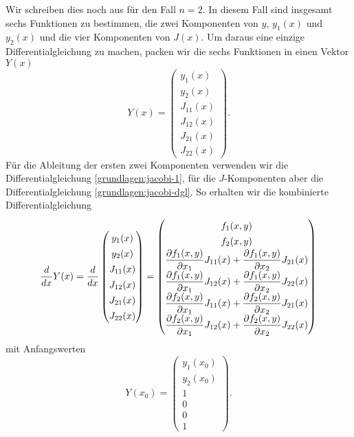Wir schreiben dies noch aus für den Fall $n=2$.
In diesem Fall sind insgesamt sechs Funktionen zu bestimmen, die
zwei Komponenten von $y$, $y_1(x)$ und $y_2(x)$ und die vier
Komponenten von $J(x)$.
Um daraus eine einzige Differentialgleichung zu machen, packen wir
die sechs Funktionen in einen Vektor $Y(x)$
\[
Y(x)=
\begin{pmatrix}
y_1(x)\\
y_2(x)\\
J_{11}(x)\\
J_{12}(x)\\
J_{21}(x)\\
J_{22}(x)
\end{pmatrix}.
\]
Für die Ableitung der ersten zwei Komponenten verwenden wir die
Differentialgleichung \eqref{grundlagen:jacobi-1}, für die $J$-Komponenten
aber die Differentialgleichung \eqref{grundlagen:jacobi-dgl}.
So erhalten wir die kombinierte Differentialgleichung
\begin{equation}
\frac{d}{dx}Y(x)
=
\frac{d}{dx}
\begin{pmatrix}
y_1(x)\\
y_2(x)\\
J_{11}(x)\\
J_{12}(x)\\
J_{21}(x)\\
J_{22}(x)
\end{pmatrix}
=
\renewcommand\arraystretch{1.35}
\begin{pmatrix}
f_1(x,y)\\
f_2(x,y)\\
\displaystyle
\frac{\partial f_1(x,y)}{\partial x_1} J_{11}(x)
	+\frac{\partial f_1(x,y)}{\partial x_2} J_{21}(x)\\
\displaystyle
\frac{\partial f_1(x,y)}{\partial x_1} J_{12}(x)
	+\frac{\partial f_1(x,y)}{\partial x_2} J_{22}(x)\\
\displaystyle
\frac{\partial f_2(x,y)}{\partial x_1} J_{11}(x)
	+\frac{\partial f_2(x,y)}{\partial x_2} J_{21}(x)\\
\displaystyle
\frac{\partial f_2(x,y)}{\partial x_1} J_{12}(x)
	+\frac{\partial f_2(x,y)}{\partial x_2} J_{22}(x)\\
\end{pmatrix}
\end{equation}
mit Anfangswerten
\begin{equation}
Y(x_0)
=
\begin{pmatrix}
y_1(x_0)\\y_2(x_0)\\
1\\0\\0\\1
\end{pmatrix}.
\end{equation}

